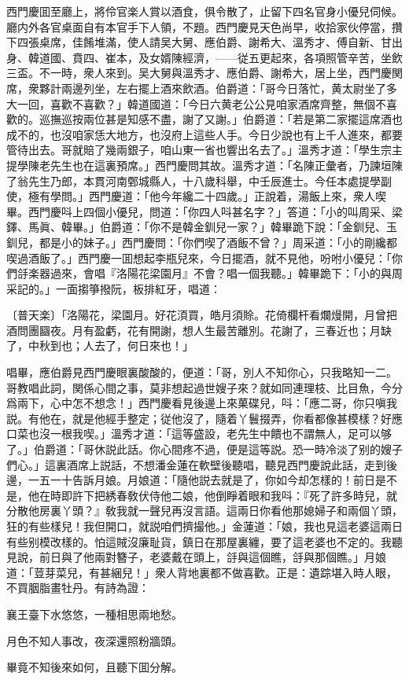 西門慶囬至廳上，將伶官楽人賞以酒食，俱令散了，止留下四名官身小優兒伺候。廳内外各官桌面自有本官手下人領，不題。西門慶見天色尚早，收拾家伙停當，攢下四張桌席，佳餚堆滿，使人請吴大舅、應伯爵、謝希大、溫秀才、傅自新、甘出身、韓道國、賁四、崔本，及女婿陳經濟，——従五更起來，各項照管辛苦，坐飲三盃。不一時，衆人來到。吴大舅與溫秀才、應伯爵、謝希大，居上坐，西門慶関席，衆夥計兩邊列坐，左右擺上酒來飲酒。伯爵道：「哥今日落忙，黄太尉坐了多大一回，喜歡不喜歡？」韓道國道：「今日六黄老公公見咱家酒席齊整，無個不喜歡的。巡撫巡按兩位甚是知感不盡，謝了又謝。」伯爵道：「若是第二家擺這席酒也成不的，也沒咱家恁大地方，也沒府上這些人手。今日少說也有上千人進來，都要管待出去。哥就賠了幾兩銀子，咱山東一省也響出名去了。」溫秀才道：「學生宗主提學陳老先生也在這裏預席。」西門慶問其故。溫秀才道：「名陳正彙者，乃諫垣陳了翁先生乃郎，本貫河南鄄城縣人，十八歲科舉，中壬辰進士。今任本處提學副使，極有學問。」西門慶道：「他今年纔二十四歲。」正說着，湯飯上來，衆人喫畢。西門慶呌上四個小優兒，問道：「你四人呌甚名字？」答道：「小的叫周采、梁鐸、馬眞、韓畢。」伯爵道：「你不是韓金釧兒一家？」韓畢跪下說：「金釧兒、玉釧兒，都是小的妹子。」西門慶問：「你們喫了酒飯不曾？」周采道：「小的剛纔都喫過酒飯了。」西門慶一囬想起李瓶兒來，今日擺酒，就不見他，吩咐小優兒：「你們㧱楽器過來，會唱『洛陽花梁園月』不會？唱一個我聽。」韓畢跪下：「小的與周采記的。」一面搊箏撥阮，板排紅牙，唱道：

\begin{myquote}
{\markfont〔普天楽〕}「洛陽花，梁園月。好花湏買，皓月須賒。花倚欄杆看爛熳開，月曾把酒問團圝夜。月有盈虧，花有開謝，想人生最苦離別。花謝了，三春近也；月缺了，中秋到也；人去了，何日來也！」
\end{myquote}

唱畢，應伯爵見西門慶眼裏酸酸的，便道：「哥，別人不知你心，只我略知一二。哥教唱此詞，関係心間之事，莫非想起過世嫂子來？就如同連理枝、比目魚，今分爲兩下，心中怎不想念！」西門慶看見後邊上來菓碟兒，呌：「應二哥，你只嗔我説。有他在，就是他經手整定；従他沒了，隨着丫鬟掇弄，你看都像甚模樣？好應口菜也沒一根我喫。」溫秀才道：「這等盛設，老先生中饋也不謂無人，足可以够了。」伯爵道：「哥休説此話。你心間疼不過，便是這等説。恐一時冷淡了别的嫂子們心。」這裏酒席上説話，不想潘金蓮在軟壁後聽唱，聽見西門慶說此話，走到後邊，一五一十告訴月娘。月娘道：「隨他説去就是了，你如今却怎樣的！前日是不是，他在時即許下把綉春敎伏侍他二娘，他倒睜着眼和我呌：『死了許多時兒，就分散他房裏丫頭？』敎我就一聲兒再沒言語。這兩日你看他那媳婦子和兩個丫頭，狂的有些樣兒！我但開口，就説咱們擠撮他。」金蓮道：「娘，我也見這老婆這兩日有些别模改樣的。怕這賊沒廉耻貨，鎮日在那屋裏纏，要了這老婆也不定的。我聽見說，前日與了他兩對簪子，老婆戴在頭上，㧱與這個瞧，㧱與那個瞧。」月娘道：「荳芽菜兒，有甚綑兒！」衆人背地裏都不做喜歡。正是：遺踪堪入時人眼，不買胭脂畫牡丹。有詩為證：

\begin{myquote}
襄王臺下水悠悠，一種相思兩地愁。

月色不知人事改，夜深還照粉牆頭。
\end{myquote}

畢竟不知後來如何，且聽下囬分解。

